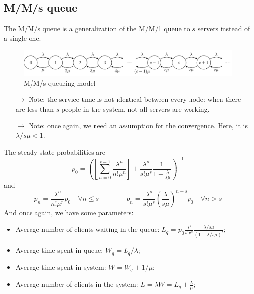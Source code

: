 \documentclass[12pt, openany]{report}
\theoremstyle{definition}
\begin{document}
\subsection{M/M/s queue}
The M/M/s queue is a generalization of the M/M/1 queue to $s$ servers instead of a single one. 
\begin{figure}[H]
	\centering 
	\includegraphics[width=.8\textwidth]{img/mms.png}
	\caption{M/M/s queueing model}
	\label{fig:queueing_model2}
\end{figure}
\begin{itemize}
	\item [$\to$] Note: the service time is not identical between every node: when there are less than $s$ people in the system, not all servers are working. 
	\item [$\to$] Note: once again, we need an assumption for the convergence. Here, it is $\lambda/s\mu < 1$.
\end{itemize}
The steady state probabilities are 
\begin{equation}
	p_0 = \left(\left[\sum_{n=0}^{s-1}\frac{\lambda^n}{n!\mu^n}\right] + \frac{\lambda^s}{s!\mu^s}\frac{1}{1-\frac{\lambda}{s\mu}}\right)^{-1}
\end{equation}
and 
\begin{equation}
	p_n = \frac{\lambda^n}{n!\mu^n}p_0 \quad \forall n\le s \qquad \qquad p_n = \frac{\lambda^s}{s!\mu^s} \left(\frac{\lambda}{s\mu}\right)^{n-s}p_0 \quad \forall n>s
\end{equation}
And once again, we have some parameters:
\begin{itemize}
	\item Average number of clients waiting in the queue: $L_q = p_0\frac{\lambda^s}{s!\mu^s}\frac{\lambda/s\mu}{(1-\lambda/s\mu)^2}$;
	\item Average time spent in queue: $W_q = L_q/\lambda$;
	\item Average time spent in system: $W = W_q + 1/\mu$;
	\item Average number of clients in the system: $L = \lambda W = L_q + \frac{\lambda}{\mu}$;
\end{itemize}
\end{document}
